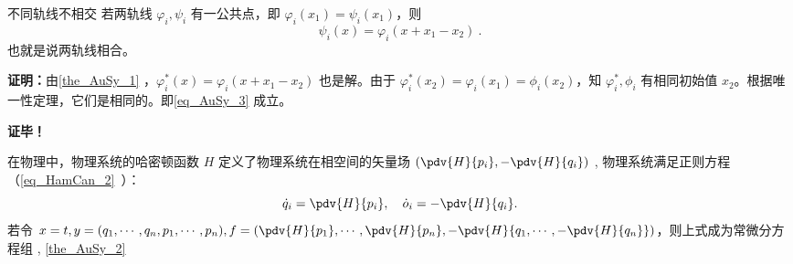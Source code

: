 \begin{theorem}{不同轨线不相交}\label{the_AuSy_2}
若两轨线 $\varphi_i,\psi_i$ 有一公共点，即 $\varphi_i(x_1)=\psi_i(x_1)$，则
\begin{equation}\label{eq_AuSy_3}
\psi_i(x)=\varphi_i(x+x_1-x_2)~.
\end{equation}
也就是说两轨线相合。
\end{theorem}
\textbf{证明：}由\autoref{the_AuSy_1} ，$\varphi^*_i(x)=\varphi_i(x+x_1-x_2)$ 也是解。由于 $\varphi^*_i(x_2)=\varphi_i(x_1)=\phi_i(x_2)$，知 $\varphi^*_i,\phi_i$ 有相同初始值 $x_2$。根据唯一性定理，它们是相同的。即\autoref{eq_AuSy_3} 成立。

\textbf{证毕！}

在物理中，物理系统的哈密顿函数 $H$ 定义了物理系统在相空间的矢量场 $(\pdv{H}{p_i},-\pdv{H}{q_i})$ , 物理系统满足正则方程（\autoref{eq_HamCan_2}~）：
\begin{equation}
\dot q_i=\pdv{H}{p_i},\quad \dot o_i=-\pdv{H}{q_i}.
\end{equation}
若令 $x=t,y=(q_1,\cdots,q_n,p_1,\cdots,p_n),f=(\pdv{H}{p_1},\cdots,\pdv{H}{p_n},-\pdv{H}{q_1,\cdots,-\pdv{H}{q_n}})$，则上式成为常微分方程组
, \autoref{the_AuSy_2} 